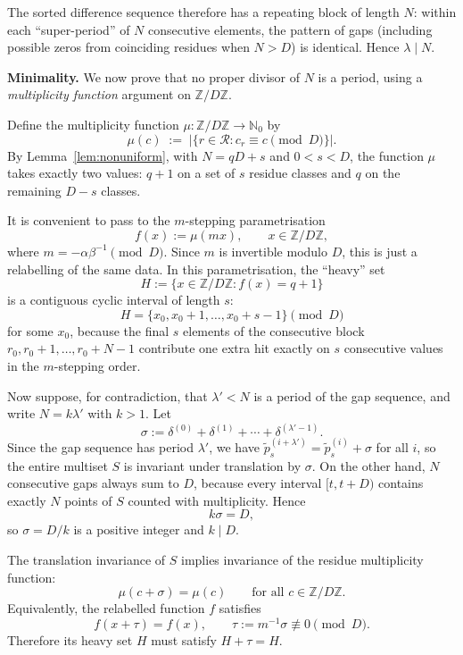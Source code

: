 \documentclass[11pt]{article}
\theoremstyle{plain}
\theoremstyle{definition}
\theoremstyle{remark}
\begin{document}
The sorted difference sequence therefore has a repeating block of length $N$:
within each ``super-period'' of $N$ consecutive elements, the pattern of
gaps (including possible zeros from coinciding residues when $N > D$)
is identical.  Hence $\lambda \mid N$.

\medskip
\noindent\textbf{Minimality.}
We now prove that no proper divisor of $N$ is a period, using a
\emph{multiplicity function} argument on $\mathbb{Z}/D\mathbb{Z}$.

Define the multiplicity function $\mu \colon \mathbb{Z}/D\mathbb{Z}
\to \mathbb{N}_0$ by
\[
    \mu(c) \;:=\; \bigl|\{r \in \mathcal{R} : c_r \equiv c \pmod{D}\}\bigr|.
\]
By Lemma~\ref{lem:nonuniform}, with $N = qD + s$ and $0 < s < D$,
the function $\mu$ takes exactly two values: $q+1$ on a set of $s$ residue
classes and $q$ on the remaining $D - s$ classes.

It is convenient to pass to the $m$-stepping parametrisation
\[
    f(x) := \mu(mx), \qquad x \in \mathbb{Z}/D\mathbb{Z},
\]
where $m=-\alpha\beta^{-1}\pmod D$.
Since $m$ is invertible modulo $D$, this is just a relabelling of the same
data.  In this parametrisation, the ``heavy'' set
\[
    H := \{x \in \mathbb{Z}/D\mathbb{Z} : f(x)=q+1\}
\]
is a contiguous cyclic interval of length $s$:
\[
    H = \{x_0, x_0+1, \ldots, x_0+s-1\}\pmod D
\]
for some $x_0$, because the final $s$ elements of the consecutive block
$r_0,r_0+1,\ldots,r_0+N-1$ contribute one extra hit exactly on $s$
consecutive values in the $m$-stepping order.

Now suppose, for contradiction, that $\lambda' < N$ is a period of the gap
sequence, and write $N = k\lambda'$ with $k>1$.
Let
\[
    \sigma := \delta^{(0)} + \delta^{(1)} + \cdots + \delta^{(\lambda'-1)}.
\]
Since the gap sequence has period $\lambda'$, we have
$\tilde p_s^{(i+\lambda')} = \tilde p_s^{(i)} + \sigma$ for all $i$, so the
entire multiset $S$ is invariant under translation by $\sigma$.
On the other hand, $N$ consecutive gaps always sum to $D$, because every
interval $[t,t+D)$ contains exactly $N$ points of $S$ counted with
multiplicity.  Hence
\[
    k\sigma = D,
\]
so $\sigma=D/k$ is a positive integer and $k \mid D$.

The translation invariance of $S$ implies invariance of the residue
multiplicity function:
\[
    \mu(c+\sigma)=\mu(c) \qquad \text{for all } c\in \mathbb{Z}/D\mathbb{Z}.
\]
Equivalently, the relabelled function $f$ satisfies
\[
    f(x+\tau)=f(x), \qquad \tau := m^{-1}\sigma \not\equiv 0 \pmod D.
\]
Therefore its heavy set $H$ must satisfy $H+\tau = H$.
\end{document}
